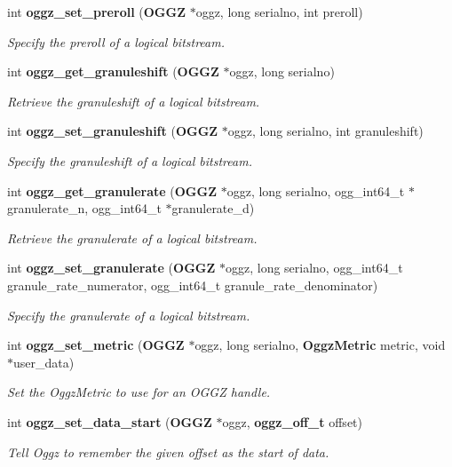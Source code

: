 \begin{DoxyCompactItemize}
int {\bf oggz\-\_\-set\-\_\-preroll} ({\bf O\-G\-G\-Z} $\ast$oggz, long serialno, int preroll)
\begin{DoxyCompactList}\small\item\em Specify the preroll of a logical bitstream. \end{DoxyCompactList}\item 
int {\bf oggz\-\_\-get\-\_\-granuleshift} ({\bf O\-G\-G\-Z} $\ast$oggz, long serialno)
\begin{DoxyCompactList}\small\item\em Retrieve the granuleshift of a logical bitstream. \end{DoxyCompactList}\item 
int {\bf oggz\-\_\-set\-\_\-granuleshift} ({\bf O\-G\-G\-Z} $\ast$oggz, long serialno, int granuleshift)
\begin{DoxyCompactList}\small\item\em Specify the granuleshift of a logical bitstream. \end{DoxyCompactList}\item 
int {\bf oggz\-\_\-get\-\_\-granulerate} ({\bf O\-G\-G\-Z} $\ast$oggz, long serialno, ogg\-\_\-int64\-\_\-t $\ast$granulerate\-\_\-n, ogg\-\_\-int64\-\_\-t $\ast$granulerate\-\_\-d)
\begin{DoxyCompactList}\small\item\em Retrieve the granulerate of a logical bitstream. \end{DoxyCompactList}\item 
int {\bf oggz\-\_\-set\-\_\-granulerate} ({\bf O\-G\-G\-Z} $\ast$oggz, long serialno, ogg\-\_\-int64\-\_\-t granule\-\_\-rate\-\_\-numerator, ogg\-\_\-int64\-\_\-t granule\-\_\-rate\-\_\-denominator)
\begin{DoxyCompactList}\small\item\em Specify the granulerate of a logical bitstream. \end{DoxyCompactList}\item 
int {\bf oggz\-\_\-set\-\_\-metric} ({\bf O\-G\-G\-Z} $\ast$oggz, long serialno, {\bf Oggz\-Metric} metric, void $\ast$user\-\_\-data)
\begin{DoxyCompactList}\small\item\em Set the Oggz\-Metric to use for an O\-G\-G\-Z handle. \end{DoxyCompactList}\item 
int {\bf oggz\-\_\-set\-\_\-data\-\_\-start} ({\bf O\-G\-G\-Z} $\ast$oggz, {\bf oggz\-\_\-off\-\_\-t} offset)
\begin{DoxyCompactList}\small\item\em Tell Oggz to remember the given offset as the start of data. \end{DoxyCompactList}\item 

\end{DoxyCompactItemize}

